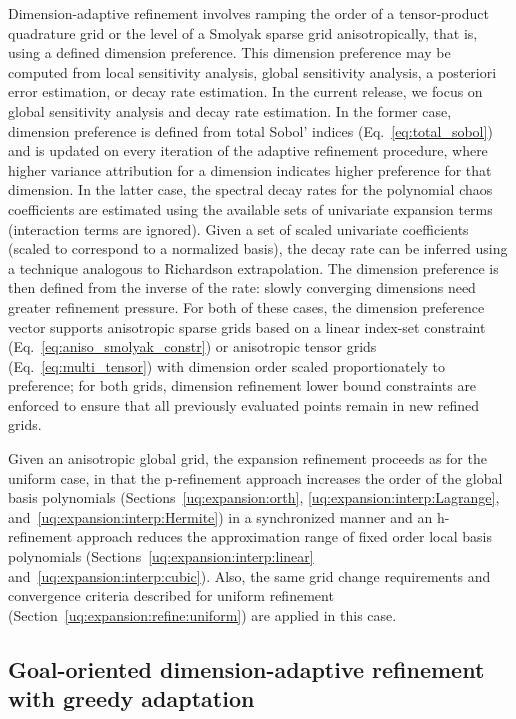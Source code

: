Dimension-adaptive refinement involves ramping the order of a
tensor-product quadrature grid or the level of a Smolyak sparse grid
anisotropically, that is, using a defined dimension preference.  This
dimension preference may be computed from local sensitivity analysis,
global sensitivity analysis, a posteriori error estimation, or decay
rate estimation.  In the current release, we focus on global
sensitivity analysis and decay rate estimation.  In the former case,
dimension preference is defined from total Sobol' indices
(Eq.~\ref{eq:total_sobol}) and is updated on every iteration of the
adaptive refinement procedure, where higher variance attribution for a
dimension indicates higher preference for that dimension.  In the
latter case, the spectral decay rates for the polynomial chaos
coefficients are estimated using the available sets of univariate
expansion terms (interaction terms are ignored).  Given a set of
scaled univariate coefficients (scaled to correspond to a normalized
basis), the decay rate can be inferred using a technique analogous to
Richardson extrapolation.  The dimension preference is then defined
from the inverse of the rate: slowly converging dimensions need
greater refinement pressure.  For both of these cases, the dimension
preference vector supports anisotropic sparse grids based on a linear
index-set constraint (Eq.~\ref{eq:aniso_smolyak_constr}) or
anisotropic tensor grids (Eq.~\ref{eq:multi_tensor}) with dimension
order scaled proportionately to preference; for both grids, dimension
refinement lower bound constraints are enforced to ensure that all
previously evaluated points remain in new refined grids.

Given an anisotropic global grid, the expansion refinement proceeds as
for the uniform case, in that the p-refinement approach increases the
order of the global basis polynomials
(Sections~\ref{uq:expansion:orth}, \ref{uq:expansion:interp:Lagrange},
and~\ref{uq:expansion:interp:Hermite}) in a synchronized manner and an
h-refinement approach reduces the approximation range of fixed order
local basis polynomials (Sections~\ref{uq:expansion:interp:linear}
and~\ref{uq:expansion:interp:cubic}).  Also, the same grid change
requirements and convergence criteria described for uniform refinement
(Section~\ref{uq:expansion:refine:uniform}) are applied in this case.


\subsection{Goal-oriented dimension-adaptive refinement with greedy adaptation}

